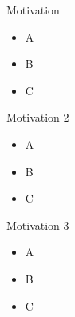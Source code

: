 \begin{frame}{Motivation}
    \begin{itemize}
        \item A
        \item B
        \item C
    \end{itemize}
\end{frame}

\begin{frame}{Motivation 2}
    \begin{itemize}
        \item A
        \item B
        \item C
    \end{itemize}
\end{frame}

\begin{frame}{Motivation 3}
    \begin{itemize}
        \item A
        \item B
        \item C
    \end{itemize}
\end{frame}